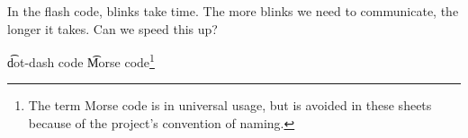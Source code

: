 

In the flash code, blinks take time.
The more blinks we need to communicate, the longer it takes.
Can we speed this up?


\t{dot-dash code}
\t{Morse code}\footnote{The term Morse code is in universal usage, but is avoided in these sheets because of the project's convention of naming.}


\blankpage
